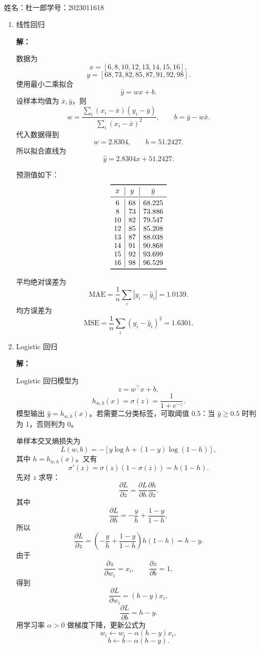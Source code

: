 \documentclass[a4paper]{article}
\makeatletter
\newcommand{\courseheader}{
        \begin{center}
            {\Large \heiti \@courseinstitute \quad \@coursename}\\[0.5em]
            {\large \@term \quad \@hwname 4 \quad \@slname}
        \end{center}
        \vspace{1em}
    }
\newcommand{\name}[1]{\noindent #1 \par\vspace{1em}}
\newenvironment{solution}{\par\noindent\textbf{解：}\par}{\par}
\makeatother
\begin{document}
\courseheader
\name{姓名：杜一郎\qquad 学号：2023011618}

\begin{enumerate}
\setlength{\itemsep}{3\parskip}

\item 线性回归

\begin{solution}
数据为
\[
x=[6,8,10,12,13,14,15,16],
\]
\[
y=[68,73,82,85,87,91,92,98].
\]
使用最小二乘拟合
\[
\hat y=wx+b.
\]
设样本均值为 \(\bar x,\bar y\)，则
\[
w=\frac{\sum_i (x_i-\bar x)(y_i-\bar y)}{\sum_i (x_i-\bar x)^2},
\qquad
b=\bar y-w\bar x.
\]
代入数据得到
\[
w=2.8304,\qquad b=51.2427.
\]
所以拟合直线为
\[
\hat y=2.8304x+51.2427.
\]

预测值如下：
\[
\begin{array}{c|c|c}
\toprule
x & y & \hat y\\
\midrule
6 & 68 & 68.225\\
8 & 73 & 73.886\\
10 & 82 & 79.547\\
12 & 85 & 85.208\\
13 & 87 & 88.038\\
14 & 91 & 90.868\\
15 & 92 & 93.699\\
16 & 98 & 96.529\\
\bottomrule
\end{array}
\]

平均绝对误差为
\[
\mathrm{MAE}
=\frac1n\sum_i |y_i-\hat y_i|
=1.0139.
\]
均方误差为
\[
\mathrm{MSE}
=\frac1n\sum_i (y_i-\hat y_i)^2
=1.6301.
\]
\end{solution}

\item Logistic 回归

\begin{solution}
Logistic 回归模型为
\[
z=w^\top x+b,
\]
\[
h_{w,b}(x)=\sigma(z)=\frac{1}{1+e^{-z}}.
\]
模型输出 \(\hat y=h_{w,b}(x)\)。若需要二分类标签，可取阈值 \(0.5\)：当 \(\hat y\ge 0.5\) 时判为 1，否则判为 0。

单样本交叉熵损失为
\[
L(w,b)
=-\left[y\log h+(1-y)\log(1-h)\right],
\]
其中 \(h=h_{w,b}(x)\)。又有
\[
\sigma'(z)=\sigma(z)(1-\sigma(z))=h(1-h).
\]
先对 \(z\) 求导：
\[
\frac{\partial L}{\partial z}
=
\frac{\partial L}{\partial h}\frac{\partial h}{\partial z}.
\]
其中
\[
\frac{\partial L}{\partial h}
=-\frac{y}{h}+\frac{1-y}{1-h},
\]
所以
\[
\frac{\partial L}{\partial z}
=
\left(-\frac{y}{h}+\frac{1-y}{1-h}\right)h(1-h)
=h-y.
\]
由于
\[
\frac{\partial z}{\partial w_i}=x_i,\qquad
\frac{\partial z}{\partial b}=1,
\]
得到
\[
\frac{\partial L}{\partial w_i}=(h-y)x_i,
\]
\[
\frac{\partial L}{\partial b}=h-y.
\]
用学习率 \(\alpha>0\) 做梯度下降，更新公式为
\[
w_i\leftarrow w_i-\alpha(h-y)x_i,
\]
\[
b\leftarrow b-\alpha(h-y).
\]
\end{solution}

\end{enumerate}
\end{document}
